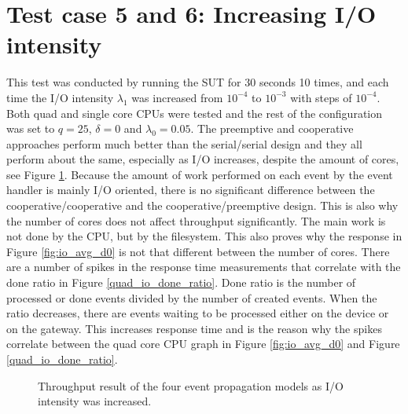 \section{Test case 5 and 6: Increasing I/O intensity}

This test was conducted by running the SUT for 30 seconds 10 times, and each
time the I/O intensity $\lambda_1$ was increased from $10^{-4}$ to $10^{-3}$
with steps of $10^{-4}$. Both quad and single core CPUs were tested and the
rest of the configuration was set to $q = 25$, $\delta = 0$ and $\lambda_0 =
0.05$. The preemptive and cooperative approaches perform much better than the
serial/serial design and they all perform about the same, especially as I/O
increases, despite the amount of cores, see Figure \ref{fig:io_throughput}.
Because the amount of work performed on each event by the event handler is
mainly I/O oriented, there is no significant difference between the
cooperative/cooperative and the cooperative/preemptive design. This is also why
the number of cores does not affect throughput significantly. The main work is
not done by the CPU, but by the filesystem. This also proves why the response
in Figure \ref{fig:io_avg_d0} is not that different between the number of
cores. There are a number of spikes in the response time measurements that
correlate with the done ratio in Figure \ref{quad_io_done_ratio}. Done ratio is
the number of processed or done events divided by the number of created events.
When the ratio decreases, there are events waiting to be processed either on
the device or on the gateway. This increases response time and is the reason
why the spikes correlate between the quad core CPU graph in Figure
\ref{fig:io_avg_d0} and Figure \ref{quad_io_done_ratio}.

\begin{figure}[h!]
    \centering
    \caption{Throughput result of the four event propagation models as I/O
    intensity was increased.}
    \label{fig:io_throughput}
\end{figure}

